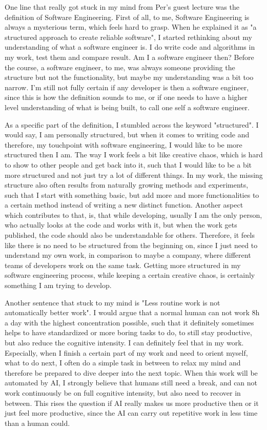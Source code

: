 \documentclass[11pt]{article}
\begin{document}
One line that really got stuck in my mind from Per's guest lecture was the definition of Software Engineering. First of all, to me, Software Engineering is always a mysterious term, which feels hard to grasp. When he explained it as "a structured approach to create reliable software", I started rethinking about my understanding of what a software engineer is. I do write code and algorithms in my work, test them and compare result. Am I a software engineer then? Before the course, a software engineer, to me, was always someone providing the structure but not the functionality, but maybe my understanding was a bit too narrow. I'm still not fully certain if any developer is then a software engineer, since this is how the definition sounds to me, or if one needs to have a higher level understanding of what is being built, to call one self a software engineer.

As a specific part of the definition, I stumbled across the keyword "structured". I would say, I am personally structured, but when it comes to writing code and therefore, my touchpoint with software engineering, I would like to be more structured then I am. The way I work feels a bit like creative chaos, which is hard to show to other people and get back into it, such that I would like to be a bit more structured and not just try a lot of different things. In my work, the missing structure also often results from naturally growing methods and experiments, such that I start with something basic, but add more and more functionalities to a certain method instead of writing a new distinct function. Another aspect which contributes to that, is, that while developing, usually I am the only person, who actually looks at the code and works with it, but when the work gets published, the code should also be understandable for others. Therefore, it feels like there is no need to be structured from the beginning on, since I just need to understand my own work, in comparison to maybe a company, where different teams of developers work on the same task. Getting more structured in my software engineering process, while keeping a certain creative chaos, is certainly something I am trying to develop.

Another sentence that stuck to my mind is "Less routine work is not automatically better work". I would argue that a normal human can not work 8h a day with the highest concentration possible, such that it definitely sometimes helps to have standardized or more boring tasks to do, to still stay productive, but also reduce the cognitive intensity. I can definitely feel that in my work. Especially, when I finish a certain part of my work and need to orient myself, what to do next, I often do a simple task in between to relax my mind and therefore be prepared to dive deeper into the next topic. When this work will be automated by AI, I strongly believe that humans still need a break, and can not work continuously be on full cognitive intensity, but also need to recover in between. This rises the question if AI really makes us more productive then or it just feel more productive, since the AI can carry out repetitive work in less time than a human could.
\end{document}
